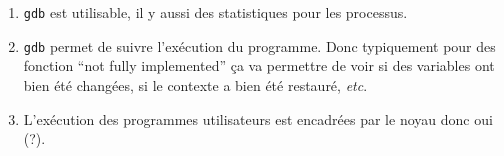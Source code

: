\documentclass{article}
\begin{document}
\begin{enumerate}
\item {\tt gdb} est utilisable, il y aussi des statistiques pour les processus.
\item {\tt gdb} permet de suivre l'exécution du programme. Donc typiquement pour des fonction ``not fully implemented'' ça va permettre de voir si des variables ont bien été changées, si le contexte a bien été restauré, {\it etc}.
\item L'exécution des programmes utilisateurs est encadrées par le noyau donc oui (?).
\end{enumerate}
\end{document}
